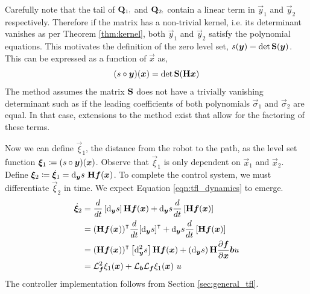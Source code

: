 \documentclass[oneside, 11pt]{book}
\begin{document}
Carefully note that the tail of $\mathbf{Q}_{1:}$ and $\mathbf{Q}_{2:}$ contain a linear term in $\vec{y}_1$ and $\vec{y}_2$ respectively. Therefore if the matrix has a non-trivial kernel, i.e. its determinant vanishes as per Theorem \ref{thm:kernel}, both $\vec{y}_1$ and $\vec{y}_2$ satisfy the polynomial equations. This motivates the definition of the zero level set, $s(\bm{y}) = \det\mathbf{S}(\bm{y})$. This can be expressed as a function of $\vec{x}$ as,
$$
    (s\circ \bm{y})(\bm{x}) = \det\mathbf{S}(\mathbf{H}\bm{x})
$$
The method assumes the matrix $\mathbf{S}$ does not have a trivially vanishing determinant such as if the leading coefficients of both polynomials $\vec{\sigma}_1$ and $\vec{\sigma}_2$ are equal. In that case, extensions to the method exist that allow for the factoring of these terms\cite{Sederberg84}.

Now we can define $\vec{\xi}_1$, the distance from the robot to the path, as the level set function $\bm{\xi}_1 \coloneqq (s\circ \bm{y})(\bm{x})$. Observe that $\vec{\xi}_1$ is only dependent on $\vec{x}_1$ and $\vec{x}_2$. Define $\bm{\xi}_2 \coloneqq \dot{\bm{\xi}}_1 = \mathop{}\!\mathrm{d}_{\bm{y}}s~\mathbf{H}\bm{f}(\bm{x})$. To complete the control system, we must differentiate $\vec{\xi}_2$ in time. We expect Equation \ref{eqn:tfl_dynamics} to emerge.
\begin{align*}
    \dot{\bm{\xi}}_2   &=  \frac{d}{dt}\left[\mathop{}\!\mathrm{d}_{\bm{y}}s\right]\mathbf{H}\bm{f}(\bm{x})
                            +
                            \mathop{}\!\mathrm{d}_{\bm{y}}s\frac{d}{dt}\left[\mathbf{H}\bm{f}(\bm{x})\right]\\
                        &=  {\left(\mathbf{H}\bm{f}(\bm{x})\right)}^{\intercal}\frac{d}{dt}{\left[\mathop{}\!\mathrm{d}_{\bm{y}}s\right]}^{\intercal}
                            +
                            \mathop{}\!\mathrm{d}_{\bm{y}}s\frac{d}{dt}\left[\mathbf{H}\bm{f}(\bm{x})\right]\\
                        &=  {\left(\mathbf{H}\bm{f}(\bm{x})\right)}^{\intercal}\left[\mathop{}\!\mathrm{d}_{\bm{y}}^2 s\right]\mathbf{H}\bm{f}(\bm{x})
                            +
                            \left(\mathop{}\!\mathrm{d}_{\bm{y}} s\right)\mathbf{H}\frac{\partial\bm{f}}{\partial\bm{x}}\bm{b}u\\
                        &= \mathcal{L}_{\bm{f}}^2 \xi_1(\bm{x}) + \mathcal{L}_{\bm{b}}\mathcal{L}_{\bm{f}}\xi_1(\bm{x})~u
\end{align*}
The controller implementation follows from Section \ref{sec:general_tfl}.
\end{document}
